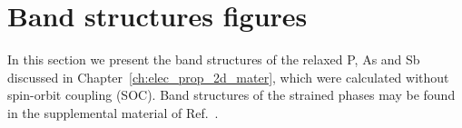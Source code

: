 \clearpage
\section{Band structures figures}
\label{sec:band_structure_figs}

In this section we present 
the band structures of the relaxed 
P, As and Sb discussed in Chapter~\ref{ch:elec_prop_2d_mater}, 
which were calculated without spin-orbit coupling (SOC).
%
Band structures of the strained phases may be 
found in the supplemental material of Ref.~\cite{2053-1583-4-4-045018}.
%
 
